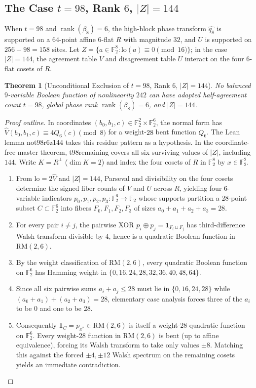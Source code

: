\documentclass[11pt]{article}
\newtheorem{theorem}{Theorem}[section]
\theoremstyle{definition}
\newcommand{\F}{\mathbb{F}}
\newcommand{\rank}{\operatorname{rank}}
\newcommand{\ind}{\mathbf{1}}
\newcommand{\code}[1]{{\ttfamily\small\renewcommand{\_}{\textunderscore\allowbreak}#1}}
\begin{document}
\subsection{The Case $t = 98$, Rank $6$, $|Z| = 144$}

When $t = 98$ and $\rank(\beta_8) = 6$, the high-block phase transform $\widehat{q_8}$ is supported on a $64$-point affine $6$-flat $R$ with magnitude $32$, and $U$ is supported on $256 - 98 = 158$ sites.
Let $Z = \{a \in \F_2^8 : \mathrm{lo}(a) \equiv 0 \pmod{16}\}$; in the case $|Z| = 144$, the agreement table $V$ and disagreement table $U$ interact on the four $6$-flat cosets of $R$.

\begin{theorem}[Unconditional Exclusion of $t = 98$, Rank $6$, $|Z| = 144$]
\label{thm:t98-r6-z144}
No balanced $9$-variable Boolean function of nonlinearity $242$ can have adapted half-agreement count $t = 98$, global phase rank $\rank(\beta_8) = 6$, and $|Z| = 144$.
\end{theorem}
\begin{proof}[Proof outline]
In coordinates $(b_0,b_1,c)\in\F_2^2\times\F_2^6$, the normal form has $\widehat V(b_0,b_1,c)\equiv 4Q_6(c)\pmod 8$ for a weight-$28$ bent function $Q_6$. The Lean lemma \code{no\_t98\_r6\_z144} takes this residue pattern as a hypothesis. In the coordinate-free master theorem, \code{t98\_remaining} covers all six surviving values of $|Z|$, including $144$.
Write $K = R^\perp$ ($\dim K = 2$) and index the four cosets of $R$ in $\F_2^8$ by $x \in \F_2^2$.
\begin{enumerate}[nosep]
  \item From $\mathrm{lo} = 2\widehat{V}$ and $|Z| = 144$, Parseval and divisibility on the four cosets determine the signed fiber counts of $V$ and $U$ across $R$, yielding four $6$-variable indicators $p_0, p_1, p_2, p_3 : \F_2^6 \to \F_2$ whose supports partition a $28$-point subset $C \subset \F_2^6$ into fibers $F_0, F_1, F_2, F_3$ of sizes $a_0 + a_1 + a_2 + a_3 = 28$.
  \item For every pair $i \neq j$, the pairwise XOR $p_i \oplus p_j = \ind_{F_i \sqcup F_j}$ has third-difference Walsh transform divisible by $4$, hence is a quadratic Boolean function in $\mathrm{RM}(2, 6)$.
  \item By the weight classification of $\mathrm{RM}(2, 6)$, every quadratic Boolean function on $\F_2^6$ has Hamming weight in $\{0, 16, 24, 28, 32, 36, 40, 48, 64\}$.
  \item Since all six pairwise sums $a_i + a_j \le 28$ must lie in $\{0, 16, 24, 28\}$ while $(a_0 + a_1) + (a_2 + a_3) = 28$, elementary case analysis forces three of the $a_i$ to be $0$ and one to be $28$.
  \item Consequently $\ind_C = p_{x^*} \in \mathrm{RM}(2, 6)$ is itself a weight-$28$ quadratic function on $\F_2^6$. Every weight-$28$ function in $\mathrm{RM}(2, 6)$ is bent (up to affine equivalence), forcing its Walsh transform to take only values $\pm 8$. Matching this against the forced $\pm 4, \pm 12$ Walsh spectrum on the remaining cosets yields an immediate contradiction. \qedhere
\end{enumerate}
\end{proof}
\end{document}

